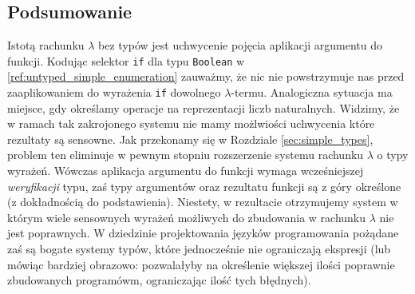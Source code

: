 \subsection{Podsumowanie}
Istotą rachunku \(\lambda\) bez typów jest uchwycenie pojęcia aplikacji argumentu do funkcji. Kodując selektor \texttt{if} dla typu \texttt{Boolean} w \ref{ref:untyped_simple_enumeration} zauważmy, że nic nie powstrzymuje nas przed zaaplikowaniem do wyrażenia \texttt{if} dowolnego \(\lambda\)-termu. Analogiczna sytuacja ma miejsce, gdy określamy operacje na reprezentacji liczb naturalnych. Widzimy, że w ramach tak zakrojonego systemu nie mamy możlwiości uchwycenia które rezultaty są sensowne. Jak przekonamy się w Rozdziale \ref{sec:simple_types}, problem ten eliminuje w pewnym stopniu rozszerzenie systemu rachunku \(\lambda\) o typy wyrażeń. Wówczas aplikacja argumentu do funkcji wymaga wcześniejszej \emph{weryfikacji} typu, zaś typy argumentów oraz rezultatu funkcji są z góry określone (z dokładnością do podstawienia). Niestety, w rezultacie otrzymujemy system w którym wiele sensownych wyrażeń możliwych do zbudowania w rachunku \(\lambda\) nie jest poprawnych. W dziedzinie projektowania języków programowania pożądane zaś są bogate systemy typów, które jednocześnie nie ograniczają ekspresji (lub mówiąc bardziej obrazowo: pozwalałyby na określenie większej ilości poprawnie zbudowanych programówm, ograniczając ilość tych błędnych). 
